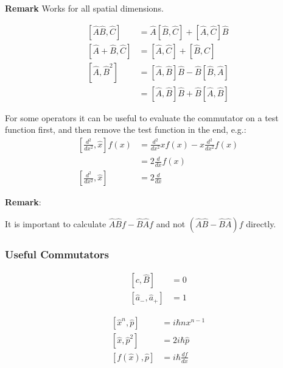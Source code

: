 \textbf{Remark} Works for all spatial dimensions.

\newpar{}

\noindent\begin{align*}
    \left[\widehat{A}\widehat{B},\widehat{C}\right]  & =\widehat{A}\left[\widehat{B},\widehat{C}\right]+\left[\widehat{A},\widehat{C}\right]\widehat{B}     \\
    \left[\widehat{A}+\widehat{B},\widehat{C}\right] & = \left[\widehat{A},\widehat{C}\right]+\left[\widehat{B},\widehat{C}\right]                          \\
    \left[\widehat{A},\widehat{B}^2\right]           & = \left[\widehat{A},\widehat{B}\right] \widehat{B} - \widehat{B}\left[\widehat{B},\widehat{A}\right] \\
                                                     & = \left[\widehat{A},\widehat{B}\right] \widehat{B} + \widehat{B}\left[\widehat{A},\widehat{B}\right]
\end{align*}


For some operators it can be useful to evaluate the commutator on a test function first, and then remove the test function in the end, e.g.:
\noindent\begin{align*}
    \left[\frac{d^2}{dx^2}, \widehat{x}\right] f(x) & = \frac{d^2}{dx^2} xf(x) - x\frac{d^2}{dx^2}f(x) \\
                                                    & = 2\frac{d}{dx} f(x)                             \\
    \left[\frac{d^2}{dx^2}, \widehat{x}\right]      & = 2\frac{d}{dx}
\end{align*}

\textbf{Remark}:

It is important to calculate $\widehat{A}\widehat{B}f - \widehat{B}\widehat{A}f$ and not $(\widehat{A}\widehat{B} - \widehat{B}\widehat{A})f$ directly.

\subsubsection{Useful Commutators}

\noindent\begin{align*}
    \left[c,\hat B\right]                        & =0  \\
    \left[\widehat{a}_{-},\widehat{a}_{+}\right] & = 1
\end{align*}

\noindent\begin{align*}
    \left[\widehat{x}^n,\widehat{p}\right]  & = i \hbar n x^{n-1}    \\
    \left[\widehat{x},\widehat{p}^2\right]  & = 2i\hbar\widehat{p}   \\
    \left[f(\widehat{x}),\widehat{p}\right] & = i \hbar\frac{df}{dx}
\end{align*}

